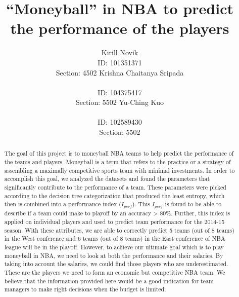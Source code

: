 \documentclass{acm_proc_article-sp}
\begin{document}
\title{``Moneyball'' in NBA to predict the performance of the players}
\author{
%
\alignauthor 
Kirill Novik\\
       \hspace{1em} ID: 101351371\\
       \hspace{1em} Section: 4502
\alignauthor
Krishna Chaitanya Sripada\\
       \\
       \hspace{1em} ID: 104375417\\
       \hspace{1em} Section: 5502
\alignauthor
Yu-Ching Kuo\\
       \\
        \hspace{1em} ID: 102589430\\
        \hspace{1em} Section: 5502
}
\maketitle
\begin{abstract}
\vspace{0.5em}
The goal of this project is to moneyball NBA teams to help predict the performance of the teams and players. Moneyball is a term that refers to the practice or a strategy of assembling a maximally competitive sports team with minimal investments. In order to accomplish this goal, we analyzed the datasets and found the parameters that significantly contribute to the performance of a team. These parameters were picked according to the decision tree categorization that produced the least entropy, which then is combined into a performance index ($I_{perf}$). This $I_{perf}$ is found to be able to describe if a team could make to playoff by an accuracy > 80\%. Further, this index is applied on individual players and used to predict team performance for the 2014-15 season. With these attributes, we are able to correctly predict 5 teams (out of 8 teams) in the West conference and 6 teams (out of 8 teams) in the East conference of NBA league will be in the playoff. However, to achieve our ultimate goal which is to play moneyball in NBA, we need to look at both the performance and their salaries. By taking into account the salaries, we could find those players who are underestimated. These are the players we need to form an economic but competitive NBA team. We believe that the information provided here would be a good indication for team managers to make right decisions when the budget is limited.\\
\end{abstract}
\end{document}
